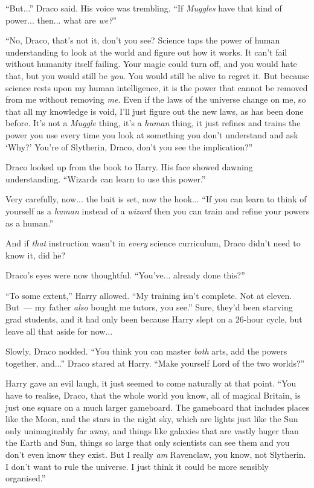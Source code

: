 ``But...'' Draco said. His voice was trembling. ``If \emph{Muggles} have that kind of power... then... what are \emph{we?}''

``No, Draco, that's not it, don't you see? Science taps the power of human understanding to look at the world and figure out how it works. It can't fail without humanity itself failing. Your magic could turn off, and you would hate that, but you would still be \emph{you}. You would still be alive to regret it. But because science rests upon my human intelligence, it is the power that cannot be removed from me without removing \emph{me.} Even if the laws of the universe change on me, so that all my knowledge is void, I'll just figure out the new laws, as has been done before. It's not a \emph{Muggle} thing, it's a \emph{human} thing, it just refines and trains the power you use every time you look at something you don't understand and ask `Why?' You're of Slytherin, Draco, don't you see the implication?''

Draco looked up from the book to Harry. His face showed dawning understanding. ``Wizards can learn to use this power.''

Very carefully, now... the bait is set, now the hook... ``If you can learn to think of yourself as a \emph{human} instead of a \emph{wizard} then you can train and refine your powers as a human.''

And if \emph{that} instruction wasn't in \emph{every} science curriculum, Draco didn't need to know it, did he?

Draco's eyes were now thoughtful. ``You've... already done this?''

``To some extent,'' Harry allowed. ``My training isn't complete. Not at eleven. But~--- my father \emph{also} bought me tutors, you see.'' Sure, they'd been starving grad students, and it had only been because Harry slept on a 26-hour cycle, but leave all that aside for now...

Slowly, Draco nodded. ``You think you can master \emph{both} arts, add the powers together, and...'' Draco stared at Harry. ``Make yourself Lord of the two worlds?''

Harry gave an evil laugh, it just seemed to come naturally at that point. ``You have to realise, Draco, that the whole world you know, all of magical Britain, is just one square on a much larger gameboard. The gameboard that includes places like the Moon, and the stars in the night sky, which are lights just like the Sun only unimaginably far away, and things like galaxies that are vastly huger than the Earth and Sun, things so large that only scientists can see them and you don't even know they exist. But I really \emph{am} Ravenclaw, you know, not Slytherin. I don't want to rule the universe. I just think it could be more sensibly organised.''

